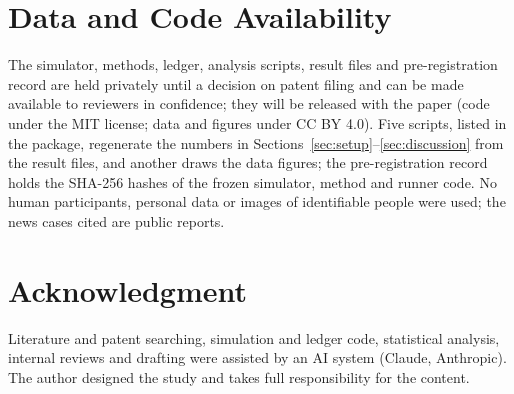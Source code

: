 \section*{Data and Code Availability}
The simulator, methods, ledger, analysis scripts, result files and pre-registration record are held privately until a decision on patent filing and can be made available to reviewers in confidence; they will be released with the paper (code under the MIT license; data and figures under CC BY 4.0). Five scripts, listed in the package, regenerate the numbers in Sections~\ref{sec:setup}--\ref{sec:discussion} from the result files, and another draws the data figures; the pre-registration record holds the SHA-256 hashes of the frozen simulator, method and runner code. No human participants, personal data or images of identifiable people were used; the news cases cited are public reports.

\section*{Acknowledgment}
Literature and patent searching, simulation and ledger code, statistical analysis, internal reviews and drafting were assisted by an AI system (Claude, Anthropic). The author designed the study and takes full responsibility for the content.

